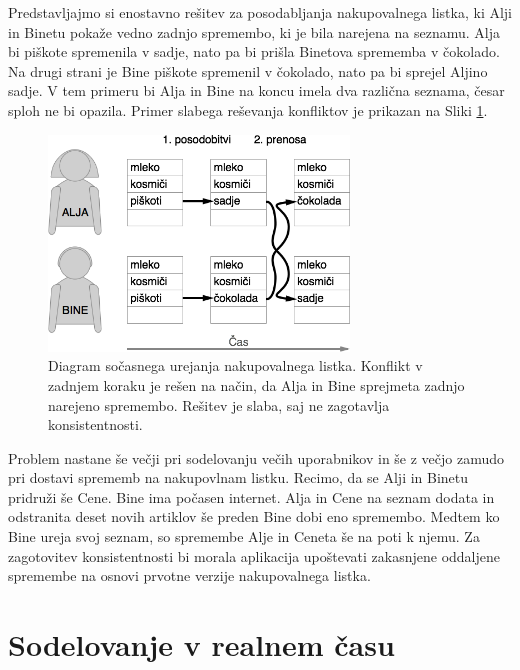 \documentclass[a4paper, 12pt, twoside]{book}
\begin{document}
\pagebreak

Predstavljajmo si enostavno rešitev za posodabljanja nakupovalnega listka, ki Alji in Binetu pokaže vedno zadnjo spremembo, ki je bila narejena na seznamu. Alja bi piškote spremenila v sadje, nato pa bi prišla Binetova sprememba v čokolado. Na drugi strani je Bine piškote spremenil v čokolado, nato pa bi sprejel Aljino sadje. V tem primeru bi Alja in Bine na koncu imela dva različna seznama, česar sploh ne bi opazila. Primer slabega reševanja konfliktov je prikazan na Sliki \ref{problem3}.

\begin{figure}[placement h]
\begin{center}
\includegraphics[width=8cm]{problem3.png}
\end{center}
\caption{Diagram sočasnega urejanja nakupovalnega listka. Konflikt v zadnjem koraku je rešen na način, da Alja in Bine sprejmeta zadnjo narejeno spremembo. Rešitev je slaba, saj ne zagotavlja konsistentnosti. }
\label{problem3}
\end{figure}

Problem nastane še večji pri sodelovanju večih uporabnikov in še z večjo zamudo pri dostavi sprememb na nakupovlnam listku. Recimo, da se Alji in Binetu pridruži še Cene. Bine ima počasen internet. Alja in Cene na seznam dodata in odstranita deset novih artiklov še preden Bine dobi eno spremembo. Medtem ko Bine ureja svoj seznam, so spremembe Alje in Ceneta še na poti k njemu. Za zagotovitev konsistentnosti bi morala aplikacija upoštevati zakasnjene oddaljene spremembe na osnovi prvotne verzije nakupovalnega listka.

\chapter{Sodelovanje v realnem času}
\end{document}
